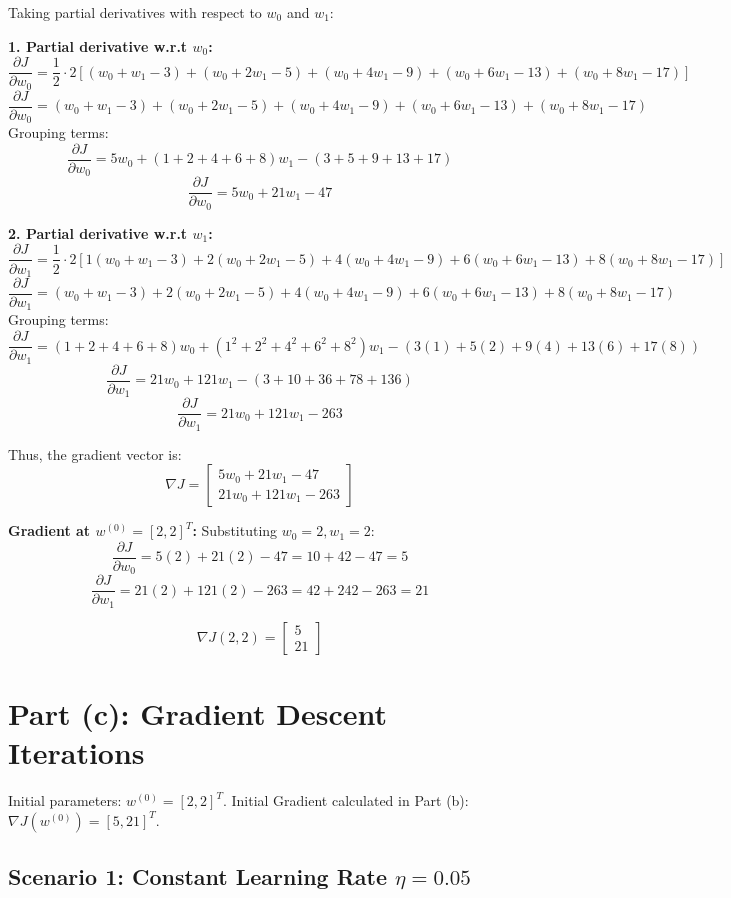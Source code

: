 \documentclass{article}
\begin{document}
Taking partial derivatives with respect to $w_0$ and $w_1$:

\textbf{1. Partial derivative w.r.t $w_0$:}
$$ \frac{\partial J}{\partial w_0} = \frac{1}{2} \cdot 2 \left[ (w_0 + w_1 - 3) + (w_0 + 2w_1 - 5) + (w_0 + 4w_1 - 9) + (w_0 + 6w_1 - 13) + (w_0 + 8w_1 - 17) \right] $$
$$ \frac{\partial J}{\partial w_0} = (w_0 + w_1 - 3) + (w_0 + 2w_1 - 5) + (w_0 + 4w_1 - 9) + (w_0 + 6w_1 - 13) + (w_0 + 8w_1 - 17) $$
Grouping terms:
$$ \frac{\partial J}{\partial w_0} = 5w_0 + (1+2+4+6+8)w_1 - (3+5+9+13+17) $$
$$ \frac{\partial J}{\partial w_0} = 5w_0 + 21w_1 - 47 $$

\textbf{2. Partial derivative w.r.t $w_1$:}
$$ \frac{\partial J}{\partial w_1} = \frac{1}{2} \cdot 2 \left[ 1(w_0 + w_1 - 3) + 2(w_0 + 2w_1 - 5) + 4(w_0 + 4w_1 - 9) + 6(w_0 + 6w_1 - 13) + 8(w_0 + 8w_1 - 17) \right] $$
$$ \frac{\partial J}{\partial w_1} = (w_0 + w_1 - 3) + 2(w_0 + 2w_1 - 5) + 4(w_0 + 4w_1 - 9) + 6(w_0 + 6w_1 - 13) + 8(w_0 + 8w_1 - 17) $$
Grouping terms:
$$ \frac{\partial J}{\partial w_1} = (1+2+4+6+8)w_0 + (1^2+2^2+4^2+6^2+8^2)w_1 - (3(1)+5(2)+9(4)+13(6)+17(8)) $$
$$ \frac{\partial J}{\partial w_1} = 21w_0 + 121w_1 - (3 + 10 + 36 + 78 + 136) $$
$$ \frac{\partial J}{\partial w_1} = 21w_0 + 121w_1 - 263 $$

Thus, the gradient vector is:
$$ \nabla J = \begin{bmatrix} 5w_0 + 21w_1 - 47 \\ 21w_0 + 121w_1 - 263 \end{bmatrix} $$

\textbf{Gradient at $w^{(0)} = [2, 2]^T$:}
Substituting $w_0=2, w_1=2$:
$$ \frac{\partial J}{\partial w_0} = 5(2) + 21(2) - 47 = 10 + 42 - 47 = 5 $$
$$ \frac{\partial J}{\partial w_1} = 21(2) + 121(2) - 263 = 42 + 242 - 263 = 21 $$

$$ \nabla J(2, 2) = \begin{bmatrix} 5 \\ 21 \end{bmatrix} $$

\section*{Part (c): Gradient Descent Iterations}
Initial parameters: $w^{(0)} = [2, 2]^T$.
Initial Gradient calculated in Part (b): $\nabla J(w^{(0)}) = [5, 21]^T$.

\subsection*{Scenario 1: Constant Learning Rate $\eta = 0.05$}
\end{document}
